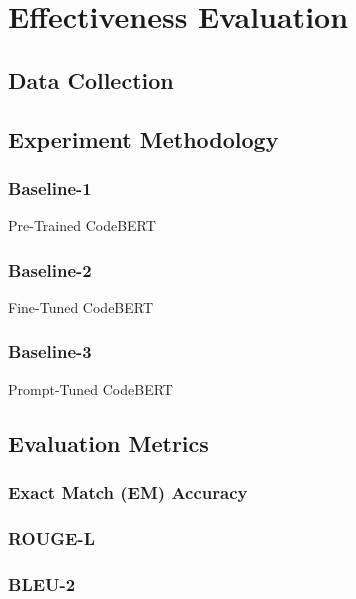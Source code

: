 \section{Effectiveness Evaluation}
\label{sec:effectiveness-eval}

\subsection{Data Collection}

\subsection{Experiment Methodology}
\subsubsection{Baseline-1} Pre-Trained CodeBERT
\subsubsection{Baseline-2} Fine-Tuned CodeBERT
\subsubsection{Baseline-3} Prompt-Tuned CodeBERT

\subsection{Evaluation Metrics}
\subsubsection{Exact Match (EM) Accuracy}
\subsubsection{ROUGE-L}
\subsubsection{BLEU-2}


